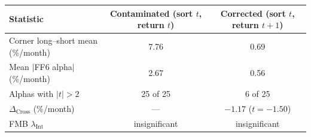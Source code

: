 \begin{tabular}{lcc}
\toprule
Statistic & Contaminated (sort $t$, return $t$) & Corrected (sort $t$, return $t{+}1$) \\
\midrule
Corner long--short mean (\%/month) & 7.76 & 0.69 \\
Mean $|$FF6 alpha$|$ (\%/month) & 2.67 & 0.56 \\
Alphas with $|t| > 2$ & 25 of 25 & 6 of 25 \\
$\Delta_\text{Cross}$ (\%/month) & --- & $-1.17$ ($t = -1.50$) \\
FMB $\lambda_\text{Int}$ & insignificant & insignificant \\
\bottomrule
\end{tabular}